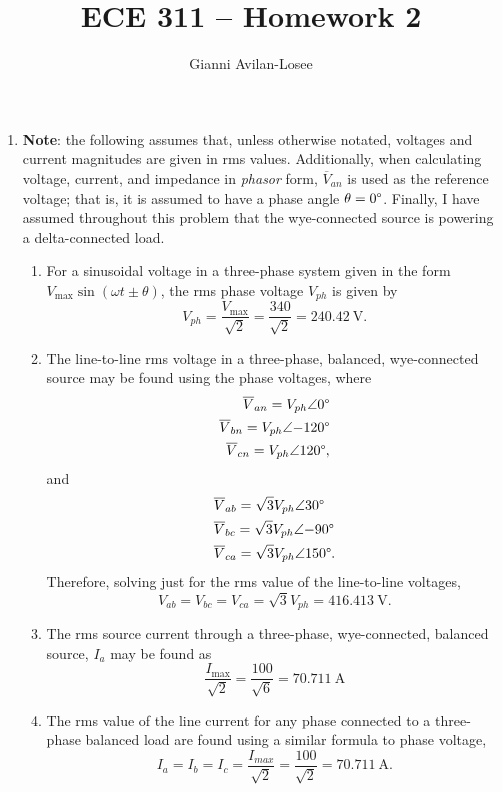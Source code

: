 \documentclass{article}
\title{ECE 311 -- Homework 2}
\author{Gianni Avilan-Losee}
\begin{document}

\begin{enumerate}[label=\thesubsection]
	\setcounter{section}{8}
	\setcounter{subsection}{1}
	\item
		\textbf{Note}: the following assumes that, unless otherwise notated, voltages and current magnitudes are given in rms values. Additionally, when calculating voltage, current, and impedance in \textit{phasor} form, \(\overline{V}_{an}\) is used as the reference voltage; that is, it is assumed to have a phase angle \(\theta = 0\degree\). Finally, I have assumed throughout this problem that the wye-connected source is powering a delta-connected load.
	\begin{enumerate}[label=\alph*)]
			\item
			For a sinusoidal voltage in a three-phase system given in the form \(V_\mathrm{{max}}\sin{(\omega t \pm \theta)}\), the rms phase voltage \({V}_{ph}\) is given by \[
				{V}_{ph} = \frac{V_{\mathrm{max}}}{\sqrt{2}} = \frac{340}{\sqrt{2}} = 240.42 \ \mathrm{V}.
			\] 
		\item The line-to-line rms voltage in a three-phase, balanced, wye-connected source may be found using the phase voltages, where 
		\begin{align*}
			{\overline{V}_{an}} = V_{ph}\angle{0\degree} \\
			{\overline{V}_{bn}} = V_{ph}\angle{-120\degree} \\
			{\overline{V}_{cn}} = V_{ph}\angle{120\degree},
		\end{align*}
		and 
			\begin{align*}
			&\overline{V}_{ab} = \sqrt{3}V_{ph}\angle{30\degree} \\
			&\overline{V}_{bc} = \sqrt{3}V_{ph}\angle{-90\degree} \\
			&\overline{V}_{ca} = \sqrt{3}V_{ph}\angle{150\degree}.
			\end{align*}
			Therefore, solving just for the rms value of the line-to-line voltages, \[ 
			V_{ab} = V_{bc} = V_{ca} = \sqrt{3}V_{ph} = 416.413 \ \mathrm{V}. 
		\]
	  \item The rms source current through a three-phase, wye-connected, balanced source, \(I_{a}\) may be found as \[
				\frac{I_{\mathrm{max}}}{\sqrt{2}} = \frac{100}{\sqrt{6}} = 70.711 \ \mathrm{A}
	  \]
		\item The rms value of the line current for any phase connected to a three-phase balanced load are found using a similar formula to phase voltage, \[
				I_a = I_b = I_c = \frac{I_{max}}{\sqrt{2}} = \frac{100}{\sqrt{2}} = 70.711 \ \mathrm{A}.
\]
\end{enumerate}
\end{enumerate}
\end{document}
